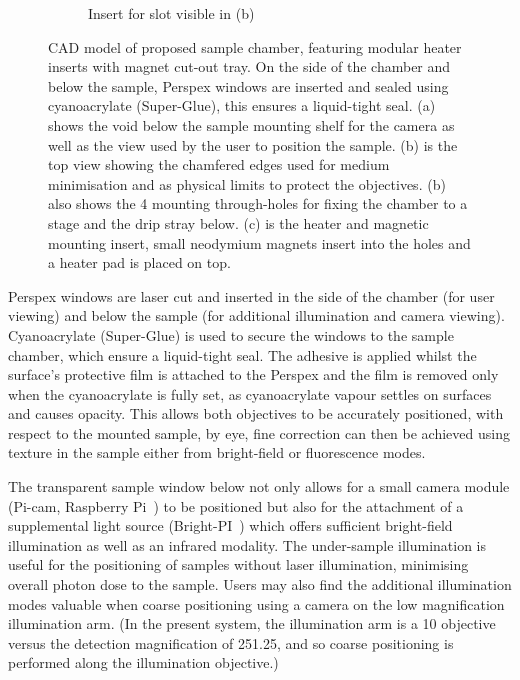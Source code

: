 \begin{figure}
\begin{subfigure}[b]{0.4\linewidth}
         \caption{Insert for slot visible in (b)}
         \label{fig:chamber_slide}
    \end{subfigure}
    \caption{CAD model of proposed sample chamber, featuring modular heater inserts with magnet cut-out tray.
    On the side of the chamber and below the sample, Perspex windows are inserted and sealed using cyanoacrylate (Super-Glue), this ensures a liquid-tight seal.
    (a) shows the void below the sample mounting shelf for the camera as well as the view used by the user to position the sample.
    (b) is the top view showing the chamfered edges used for medium minimisation and as physical limits to protect the objectives.
    (b) also shows the 4 mounting through-holes for fixing the chamber to a stage and the drip stray below.
    (c) is the heater and magnetic mounting insert, small neodymium magnets insert into the holes and a heater pad is placed on top.
    }
\end{figure}

Perspex windows are laser cut and inserted in the side of the chamber (for user viewing) and below the sample (for additional illumination and camera viewing).
Cyanoacrylate (Super-Glue) is used to secure the windows to the sample chamber, which ensure a liquid-tight seal.
The adhesive is applied whilst the surface's protective film is attached to the Perspex and the film is removed only when the cyanoacrylate is fully set, as cyanoacrylate vapour settles on surfaces and causes opacity.
This allows both objectives to be accurately positioned, with respect to the mounted sample, by eye, fine correction can then be achieved using texture in the sample either from bright-field or fluorescence modes.

The transparent sample window below not only allows for a small camera module (Pi-cam, Raspberry Pi~\cite{BrightPiBright}) to be positioned
but also for the attachment of a supplemental light source (Bright-PI~\cite{CameraModuleV2}) which offers sufficient bright-field illumination as well as an infrared modality.
The under-sample illumination is useful for the positioning of samples without laser illumination, minimising overall photon dose to the sample.
Users may also find the additional illumination modes valuable when coarse positioning using a camera on the low magnification illumination arm.
(In the present system, the illumination arm is a \SI{10}{\times} objective versus the detection magnification of \SI{25}{\times}\SI{1.25}{\times}, and so coarse positioning is performed along the illumination objective.)

